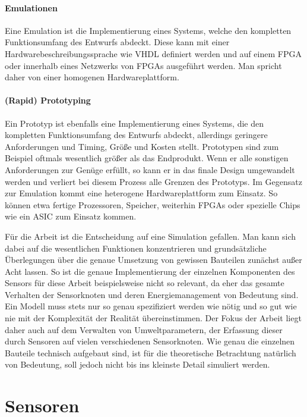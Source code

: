 \paragraph{Emulationen}

Eine Emulation ist die Implementierung eines Systems, welche den kompletten Funktionsumfang des Entwurfs abdeckt. Diese kann mit einer Hardwarebeschreibungssprache wie VHDL definiert werden und auf einem FPGA oder innerhalb eines Netzwerks von FPGAs ausgeführt werden. Man spricht daher von einer homogenen Hardwareplattform.

\paragraph{(Rapid) Prototyping}

Ein Prototyp ist ebenfalls eine Implementierung eines Systems, die den kompletten Funktionsumfang des Entwurfs abdeckt, allerdings geringere Anforderungen und Timing, Größe und Kosten stellt. Prototypen sind zum Beispiel oftmals wesentlich größer als das Endprodukt. Wenn er alle sonstigen Anforderungen zur Genüge erfüllt, so kann er in das finale Design umgewandelt werden und verliert bei diesem Prozess alle Grenzen des Prototyps. Im Gegensatz zur Emulation kommt eine heterogene Hardwareplattform zum Einsatz. So können etwa fertige Prozessoren, Speicher, weiterhin FPGAs oder spezielle Chips wie ein ASIC zum Einsatz kommen.

\endgraf

Für die Arbeit ist die Entscheidung auf eine Simulation gefallen. Man kann sich dabei auf die wesentlichen Funktionen konzentrieren und grundsätzliche Überlegungen über die genaue Umsetzung von gewissen Bauteilen zunächst außer Acht lassen. So ist die genaue Implementierung der einzelnen Komponenten des Sensors für diese Arbeit beispielsweise nicht so relevant, da eher das gesamte Verhalten der Sensorknoten und deren Energiemanagement von Bedeutung sind. Ein Modell muss stets nur so genau spezifiziert werden wie nötig und so gut wie nie mit der Komplexität der Realität übereinstimmen. \newline
Der Fokus der Arbeit liegt daher auch auf dem Verwalten von Umweltparametern, der Erfassung dieser durch Sensoren auf vielen verschiedenen Sensorknoten. Wie genau die einzelnen Bauteile technisch aufgebaut sind, ist für die theoretische Betrachtung natürlich von Bedeutung, soll jedoch nicht bis ins kleinste Detail simuliert werden.

\section{Sensoren}

